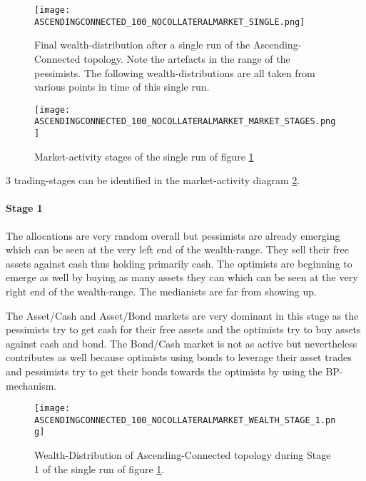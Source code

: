 \documentclass[Bachelorarbeit.tex]{subfiles}
\begin{document}
\medskip

\begin{figure}[H]
	\centering
  \texttt{[image: ASCENDINGCONNECTED\_100\_NOCOLLATERALMARKET\_SINGLE.png]}
	\caption{Final wealth-distribution after a single run of the Ascending-Connected topology. Note the artefacts in the range of the pessimists. The following wealth-distributions are all taken from various points in time of this single run.}
	\label{fig:wealth_ASCENDINGCONNECTED_100_NOCOLLATERALMARKET_SINGLE}
\end{figure}

\begin{figure}[H]
	\centering
  \texttt{[image: ASCENDINGCONNECTED\_100\_NOCOLLATERALMARKET\_MARKET\_STAGES.png]}
  	\caption{Market-activity stages of the single run of figure \ref{fig:wealth_ASCENDINGCONNECTED_100_NOCOLLATERALMARKET_SINGLE}}
	\label{fig:markets_ASCENDINGCONNECTED_100_NOCOLLATERALMARKET_MARKET_STAGES}
\end{figure}

3 trading-stages can be identified in the market-activity diagram \ref{fig:markets_ASCENDINGCONNECTED_100_NOCOLLATERALMARKET_MARKET_STAGES}.

\paragraph{Stage 1}
The allocations are very random overall but pessimists are already emerging which can be seen at the very left end of the wealth-range. They sell their free assets against cash thus holding primarily cash. The optimists are beginning to emerge as well by buying as many assets they can which can be seen at the very right end of the wealth-range. The medianists are far from showing up.

\medskip

The Asset/Cash and Asset/Bond markets are very dominant in this stage as the pessimists try to get cash for their free assets and the optimists try to buy assets against cash and bond. The Bond/Cash market is not as active but nevertheless contributes as well because optimists using bonds to leverage their asset trades and pessimists try to get their bonds towards the optimists by using the BP-mechanism.

\begin{figure}[H]
	\centering
  \texttt{[image: ASCENDINGCONNECTED\_100\_NOCOLLATERALMARKET\_WEALTH\_STAGE\_1.png]}
  	\caption{Wealth-Distribution of Ascending-Connected topology during Stage 1 of the single run of figure \ref{fig:wealth_ASCENDINGCONNECTED_100_NOCOLLATERALMARKET_SINGLE}.}
	\label{fig:markets_ASCENDINGCONNECTED_100_NOCOLLATERALMARKET_WEALTH_STAGE_1}
\end{figure}
\end{document}

